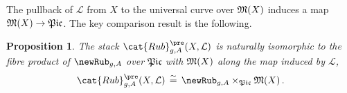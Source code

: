 \documentclass[a4paper,12pt]{article} %
\newcommand{\MWvone}[1]{}%
\newcommand{\MWref}[1]{#1}
\newcommand{\on}[1]{\operatorname{#1}}
\newcommand{\ca}[1]{{\mathcal{#1}}}
\newcommand{\bd}[1]{{\mathbf{#1}}}
\newcommand{\hra}{\hookrightarrow}
\theoremstyle{definition}
\theoremstyle{plain}%
\newtheorem{proposition}[definition]{Proposition}
\newcommand{\Picabs}{\mathfrak{Pic}}
\newcommand{\Picrel}{\mathfrak{Pic}^{\mathrm{rel}}}
\begin{document}
The pullback of $\ca L$ from $X$ to the universal curve over $\frak M(X)$ induces a map $\frak M(X) \to \frak{Pic}$. The key comparison result is the following. 



\begin{proposition}\label{lem:prestable_stack_comparison}
The stack $\cat{Rub}_{g,A}^{\pre}(X, \ca L)$ is naturally isomorphic to the fibre product of $\newRub_{g,A}$ over $\Picabs$ with $\frak M(X)$ along the map induced by $\ca L$,
$$\cat{Rub}_{g,A}^{\pre}(X, \ca L)\,  \stackrel{\sim}{=}\,  \newRub_{g,A} \times_{\Picabs} {\frak{M}(X)} \, .$$
\end{proposition}
\end{document}
